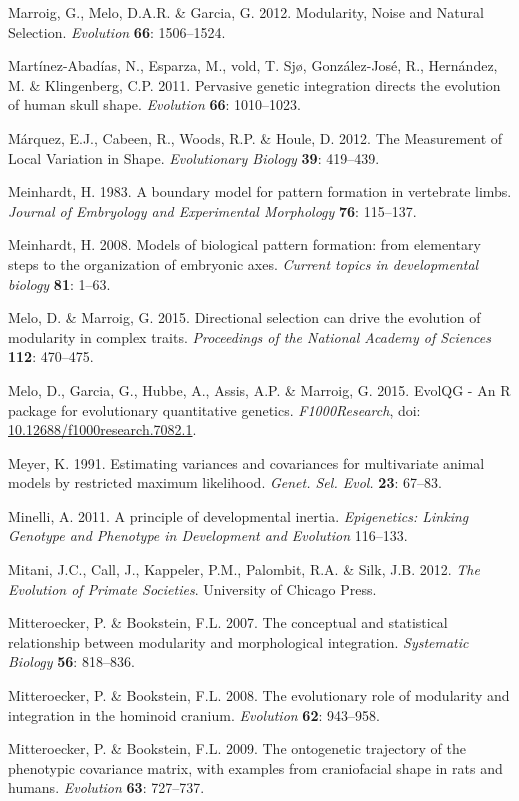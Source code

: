 \documentclass[12pt,twoside]{report}
\begin{document}
Marroig, G., Melo, D.A.R. \& Garcia, G. 2012. Modularity, Noise and
Natural Selection. \emph{Evolution} \textbf{66}: 1506--1524.

Martínez-Abadías, N., Esparza, M., vold, T. Sjø, González-José, R.,
Hernández, M. \& Klingenberg, C.P. 2011. Pervasive genetic integration
directs the evolution of human skull shape. \emph{Evolution}
\textbf{66}: 1010--1023.

Márquez, E.J., Cabeen, R., Woods, R.P. \& Houle, D. 2012. The
Measurement of Local Variation in Shape. \emph{Evolutionary Biology}
\textbf{39}: 419--439.

Meinhardt, H. 1983. A boundary model for pattern formation in vertebrate
limbs. \emph{Journal of Embryology and Experimental Morphology}
\textbf{76}: 115--137.

Meinhardt, H. 2008. Models of biological pattern formation: from
elementary steps to the organization of embryonic axes. \emph{Current
topics in developmental biology} \textbf{81}: 1--63.

Melo, D. \& Marroig, G. 2015. Directional selection can drive the
evolution of modularity in complex traits. \emph{Proceedings of the
National Academy of Sciences} \textbf{112}: 470--475.

Melo, D., Garcia, G., Hubbe, A., Assis, A.P. \& Marroig, G. 2015. EvolQG
- An R package for evolutionary quantitative genetics.
\emph{F1000Research}, doi:
\href{http://dx.doi.org/10.12688/f1000research.7082.1}{10.12688/f1000research.7082.1}.

Meyer, K. 1991. Estimating variances and covariances for multivariate
animal models by restricted maximum likelihood. \emph{Genet. Sel. Evol.}
\textbf{23}: 67--83.

Minelli, A. 2011. A principle of developmental inertia.
\emph{Epigenetics: Linking Genotype and Phenotype in Development and
Evolution} 116--133.

Mitani, J.C., Call, J., Kappeler, P.M., Palombit, R.A. \& Silk, J.B.
2012. \emph{The Evolution of Primate Societies}. University of Chicago
Press.

Mitteroecker, P. \& Bookstein, F.L. 2007. The conceptual and statistical
relationship between modularity and morphological integration.
\emph{Systematic Biology} \textbf{56}: 818--836.

Mitteroecker, P. \& Bookstein, F.L. 2008. The evolutionary role of
modularity and integration in the hominoid cranium. \emph{Evolution}
\textbf{62}: 943--958.

Mitteroecker, P. \& Bookstein, F.L. 2009. The ontogenetic trajectory of
the phenotypic covariance matrix, with examples from craniofacial shape
in rats and humans. \emph{Evolution} \textbf{63}: 727--737.
\end{document}
